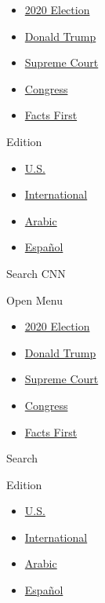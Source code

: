 \begin{itemize}
\tightlist
\item
  \href{/election/2020}{2020 Election}
\item
  \href{/specials/politics/president-donald-trump-45}{Donald Trump}
\item
  \href{/specials/politics/supreme-court-nine}{Supreme Court}
\item
  \href{/specials/politics/congress}{Congress}
\item
  \href{/specials/politics/fact-check-politics}{Facts First}
\end{itemize}

Edition

\begin{itemize}
\tightlist
\item
  \href{//us.cnn.com?hpt=header_edition-picker}{U.S.}
\item
  \href{//edition.cnn.com?hpt=header_edition-picker}{International}
\item
  \href{//arabic.cnn.com?hpt=header_edition-picker}{Arabic}
\item
  \href{//cnnespanol.cnn.com?hpt=header_edition-picker}{Español}
\end{itemize}

Search CNN

Open Menu

\begin{itemize}
\tightlist
\item
  \href{/election/2020}{2020 Election}
\item
  \href{/specials/politics/president-donald-trump-45}{Donald Trump}
\item
  \href{/specials/politics/supreme-court-nine}{Supreme Court}
\item
  \href{/specials/politics/congress}{Congress}
\item
  \href{/specials/politics/fact-check-politics}{Facts First}
\end{itemize}

Search

Edition

\begin{itemize}
\tightlist
\item
  \href{//us.cnn.com?hpt=header_edition-picker}{U.S.}
\item
  \href{//edition.cnn.com?hpt=header_edition-picker}{International}
\item
  \href{//arabic.cnn.com?hpt=header_edition-picker}{Arabic}
\item
  \href{//cnnespanol.cnn.com?hpt=header_edition-picker}{Español}
\end{itemize}


